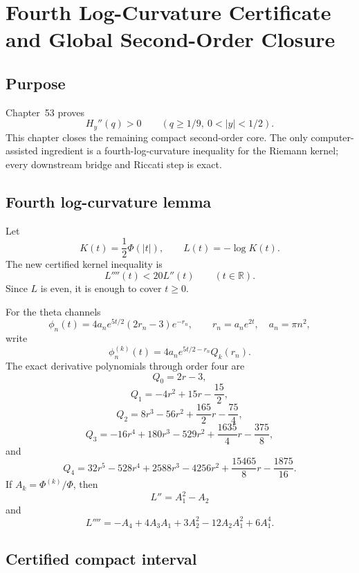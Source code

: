 \chapter{Fourth Log-Curvature Certificate and Global Second-Order Closure}
\label{chap:g024-global-second-order}


\section{Purpose}

Chapter~53 proves
\[
 \boxed{H_y''(q)>0\qquad(q\ge1/9,\ 0<|y|<1/2)}.
\]
This chapter closes the remaining compact second-order core. The only computer-assisted ingredient is a fourth-log-curvature inequality for the Riemann kernel; every downstream bridge and Riccati step is exact.

\section{Fourth log-curvature lemma}

Let
\[
 K(t)=\frac12\Phi(|t|),
 \qquad
 L(t)=-\log K(t).
\]
The new certified kernel inequality is
\[
 \boxed{L''''(t)<20L''(t)\qquad(t\in\mathbb R).}
 \tag{54.1}
\]
Since $L$ is even, it is enough to cover $t\ge0$.

For the theta channels
\[
 \phi_n(t)=4a_ne^{5t/2}(2r_n-3)e^{-r_n},
 \qquad
 r_n=a_ne^{2t},\quad a_n=\pi n^2,
\]
write
\[
 \phi_n^{(k)}(t)=4a_ne^{5t/2-r_n}Q_k(r_n).
\]
The exact derivative polynomials through order four are
\[
 Q_0=2r-3,
\]
\[
 Q_1=-4r^2+15r-\frac{15}{2},
\]
\[
 Q_2=8r^3-56r^2+\frac{165}{2}r-\frac{75}{4},
\]
\[
 Q_3=-16r^4+180r^3-529r^2+\frac{1635}{4}r-\frac{375}{8},
\]
and
\[
 Q_4=32r^5-528r^4+2588r^3-4256r^2+\frac{15465}{8}r-\frac{1875}{16}.
\]
If $A_k=\Phi^{(k)}/\Phi$, then
\[
 L''=A_1^2-A_2
\]
and
\[
 L''''=-A_4+4A_3A_1+3A_2^2-12A_2A_1^2+6A_1^4.
\]

\section{Certified compact interval}

